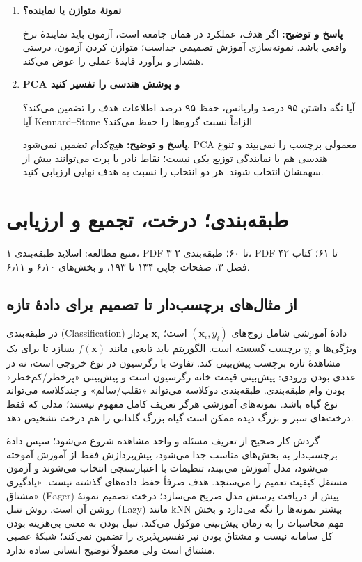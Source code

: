 \documentclass[12pt,a4paper,oneside]{report}
\newcounter{ex}[chapter]
\newenvironment{selftests}{\begin{enumerate}\setlength{\itemsep}{9pt}}{\end{enumerate}}
\newenvironment{selftest}[1]{\item\textbf{#1}\par}{\par}
\newcommand{\answer}[1]{\par{\color{teal}\bfseries پاسخ و توضیح: }#1\par}
\newcommand{\source}[1]{\par{\small\color{muted} منبع مطالعه: #1}\par}
\begin{document}
\begin{selftests}
\begin{selftest}{نمونهٔ متوازن یا نماینده؟}
\answer{اگر هدف، عملکرد در همان جامعه است، آزمون باید نمایندهٔ نرخ واقعی باشد. نمونه‌سازی آموزش تصمیمی جداست؛ متوازن کردن آزمون، درستی هشدار و برآورد فایدهٔ عملی را عوض می‌کند.}
\end{selftest}
\begin{selftest}{PCA و پوشش هندسی را تفسیر کنید}
آیا نگه داشتن ۹۵ درصد واریانس، حفظ ۹۵ درصد اطلاعات هدف را تضمین می‌کند؟ آیا Kennard--Stone الزاماً نسبت گروه‌ها را حفظ می‌کند؟
\answer{هیچ‌کدام تضمین نمی‌شود. PCA معمولی برچسب را نمی‌بیند و تنوع هندسی هم با نمایندگی توزیع یکی نیست؛ نقاط نادر یا پرت می‌توانند بیش از سهمشان انتخاب شوند. هر دو انتخاب را نسبت به هدف نهایی ارزیابی کنید.}
\end{selftest}
\end{selftests}

\chapter{طبقه‌بندی؛ درخت، تجمیع و ارزیابی}
\source{اسلاید طبقه‌بندی ۱، PDF ۳ تا ۶۰؛ طبقه‌بندی ۲، PDF ۴۲ تا ۶۱؛ کتاب فصل ۳، صفحات چاپی ۱۳۴ تا ۱۹۳، و بخش‌های ۶٫۱۰ و ۶٫۱۱.}
\section{از مثال‌های برچسب‌دار تا تصمیم برای دادهٔ تازه}

در طبقه‌بندی (Classification) دادهٔ آموزشی شامل زوج‌های $(\mathbf x_i,y_i)$ است؛ $\mathbf x_i$ بردار ویژگی‌ها و $y_i$ برچسب گسسته است. الگوریتم باید تابعی مانند $f(\mathbf x)$ بسازد تا برای یک مشاهدهٔ تازه برچسب پیش‌بینی کند. تفاوت با رگرسیون در نوع خروجی است، نه در عددی بودن ورودی: پیش‌بینی قیمت خانه رگرسیون است و پیش‌بینی «پرخطر/کم‌خطر» بودن وام طبقه‌بندی. طبقه‌بندی دوکلاسه می‌تواند «تقلب/سالم» و چندکلاسه می‌تواند نوع گیاه باشد. نمونه‌های آموزشی هرگز تعریف کامل مفهوم نیستند؛ مدلی که فقط درخت‌های سبز و بزرگ دیده ممکن است گیاه بزرگ گلدانی را هم درخت تشخیص دهد.

گردش کار صحیح از تعریف مسئله و واحد مشاهده شروع می‌شود؛ سپس دادهٔ برچسب‌دار به بخش‌های مناسب جدا می‌شود، پیش‌پردازش فقط از آموزش آموخته می‌شود، مدل آموزش می‌بیند، تنظیمات با اعتبارسنجی انتخاب می‌شوند و آزمون مستقل کیفیت تعمیم را می‌سنجد. هدف صرفاً حفظ داده‌های گذشته نیست. «یادگیری مشتاق» (Eager) پیش از دریافت پرسش مدل صریح می‌سازد؛ درخت تصمیم نمونهٔ روشن آن است. روش تنبل (Lazy) مانند kNN بیشتر نمونه‌ها را نگه می‌دارد و بخش مهم محاسبات را به زمان پیش‌بینی موکول می‌کند. تنبل بودن به معنی بی‌هزینه بودن کل سامانه نیست و مشتاق بودن نیز تفسیرپذیری را تضمین نمی‌کند؛ شبکهٔ عصبی مشتاق است ولی معمولاً توضیح انسانی ساده ندارد.
\end{document}
